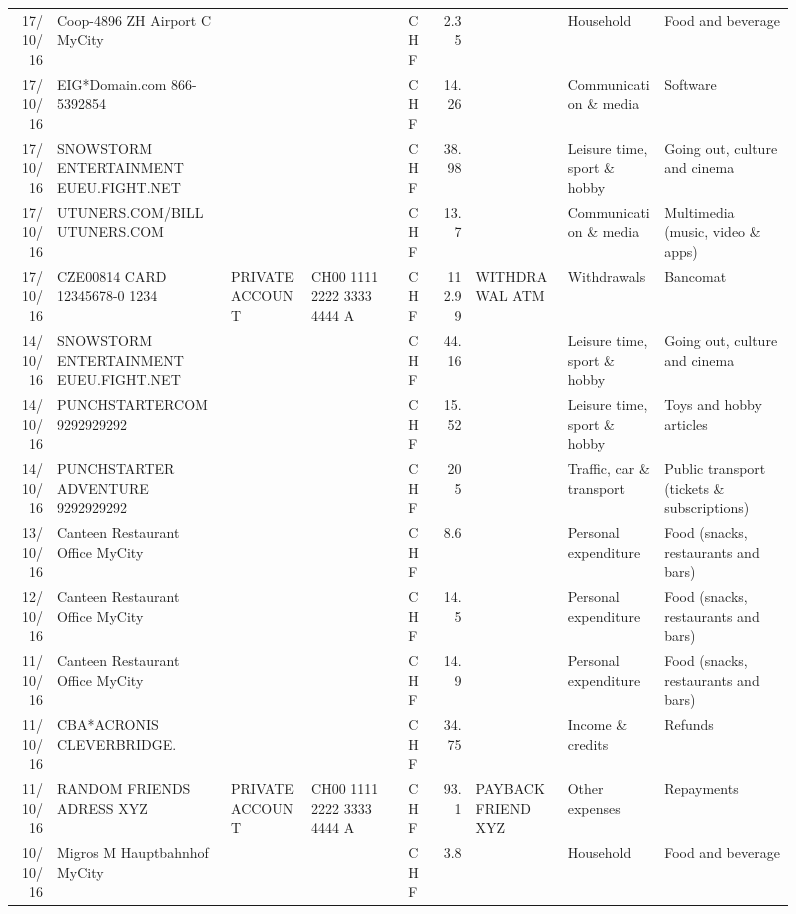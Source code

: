 \begin{landscape}
\begin{sidewaysfigure}
\begin{table}[h]
\begin{center}
\begin{tabular}{rllllrlll}
		17/10/16 & Coop-4896 ZH Airport C   MyCity &       &       & CHF   & 2.35  &       & Household & Food and beverage \\
		17/10/16 & EIG*Domain.com           866-5392854 &       &       & CHF   & 14.26 &       & Communication \& media & Software \\
		17/10/16 & SNOWSTORM ENTERTAINMENT EUEU.FIGHT.NET &       &       & CHF   & 38.98 &       & Leisure time, sport \& hobby & Going out, culture and cinema \\
		17/10/16 & UTUNERS.COM/BILL          UTUNERS.COM &       &       & CHF   & 13.7  &       & Communication \& media & Multimedia (music, video \& apps) \\
		17/10/16 & CZE00814 CARD 12345678-0 1234 & PRIVATE ACCOUNT & CH00 1111 2222 3333 4444 A & CHF   & 112.99 & WITHDRAWAL ATM & Withdrawals & Bancomat \\
		14/10/16 & SNOWSTORM ENTERTAINMENT EUEU.FIGHT.NET &       &       & CHF   & 44.16 &       & Leisure time, sport \& hobby & Going out, culture and cinema \\
		14/10/16 & PUNCHSTARTERCOM           9292929292 &       &       & CHF   & 15.52 &       & Leisure time, sport \& hobby & Toys and hobby articles \\
		14/10/16 & PUNCHSTARTER ADVENTURE    9292929292 &       &       & CHF   & 205   &       & Traffic, car \& transport & Public transport (tickets \& subscriptions) \\
		13/10/16 & Canteen Restaurant Office      MyCity &       &       & CHF   & 8.6   &       & Personal expenditure & Food (snacks, restaurants and bars) \\
		12/10/16 & Canteen Restaurant Office      MyCity &       &       & CHF   & 14.5  &       & Personal expenditure & Food (snacks, restaurants and bars) \\
		11/10/16 & Canteen Restaurant Office      MyCity &       &       & CHF   & 14.9  &       & Personal expenditure & Food (snacks, restaurants and bars) \\
		11/10/16 & CBA*ACRONIS              CLEVERBRIDGE. &       &       & CHF   & 34.75 &       & Income \& credits & Refunds \\
		11/10/16 & RANDOM FRIENDS ADRESS XYZ & PRIVATE ACCOUNT & CH00 1111 2222 3333 4444 A & CHF   & 93.1  & PAYBACK FRIEND XYZ & Other expenses & Repayments \\
		10/10/16 & Migros M Hauptbahnhof    MyCity &       &       & CHF   & 3.8   &       & Household & Food and beverage \\

\end{tabular}
\end{center}
\end{table}
\end{sidewaysfigure}
\end{landscape}
